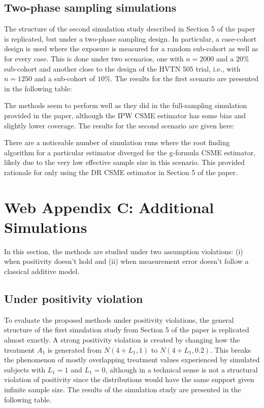 \documentclass[12pt]{article}
\begin{document}
\subsection{Two-phase sampling simulations}

The structure of the second simulation study described in Section 5 of the paper is replicated, but under a two-phase sampling design. In particular, a case-cohort design is used where the exposure is measured for a random sub-cohort as well as for every case. This is done under two scenarios, one with $n=2000$ and a $20\%$ sub-cohort and another close to the design of the HVTN 505 trial, i.e., with $n=1250$ and a sub-cohort of $10\%$. The results for the first scenario are presented in the following table:

The methods seem to perform well as they did in the full-sampling simulation provided in the paper, although the IPW CSME estimator has some bias and slightly lower coverage. The results for the second scenario are given here:

There are a noticeable number of simulation runs where the root finding algorithm for a particular estimator diverged for the g-formula CSME estimator, likely due to the very low effective sample size in this scenario. This provided rationale for only using the DR CSME estimator in Section 5 of the paper.

\section{Web Appendix C: Additional Simulations}

In this section, the methods are studied under two assumption violations: (i) when positivity doesn't hold and (ii) when measurement error doesn't follow a classical additive model.

\subsection{Under positivity violation}

To evaluate the proposed methods under positivity violations, the general structure of the first simulation study from Section 5 of the paper is replicated almost exactly. A strong positivity violation is created by changing how the treatment $A_{1}$ is generated from $N(4 + L_{1}, 1)$ to $N(4 + L_{1}, 0.2)$. This breaks the phenomenon of mostly overlapping treatment values experienced by simulated subjects with $L_{1} = 1$ and $L_{1} = 0$, although in a technical sense is not a structural violation of positivity since the distributions would have the same support given infinite sample size. The results of the simulation study are presented in the following table.
\end{document}
